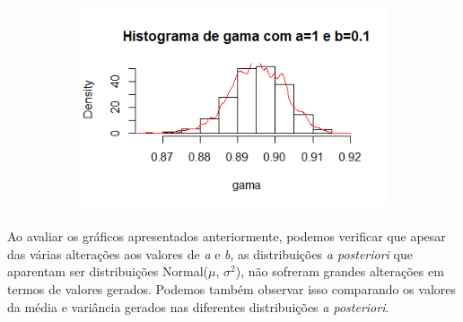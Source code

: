 \documentclass{article}
\begin{document}
\begin{figure}[H]
\begin{subfigure}[h]{0.6\textwidth}
 					 \end{subfigure}
					 \begin{subfigure}[sh]{0.6\textwidth}
   						 \includegraphics[width=\textwidth]{a1-0b0-1}
 					 \end{subfigure}
				\end{figure}
				\paragraph{}
				
				Ao avaliar os gráficos apresentados anteriormente, podemos verificar que apesar das várias alterações aos valores de \textit{a} e \textit{b}, as distribuições \textit{a posteriori} que aparentam ser distribuições Normal($\mu$, $\sigma^2$), não sofreram grandes alterações em termos de valores gerados. Podemos também observar isso comparando os valores da média e variância gerados nas diferentes distribuições \textit{a posteriori}.

	
\end{document}
